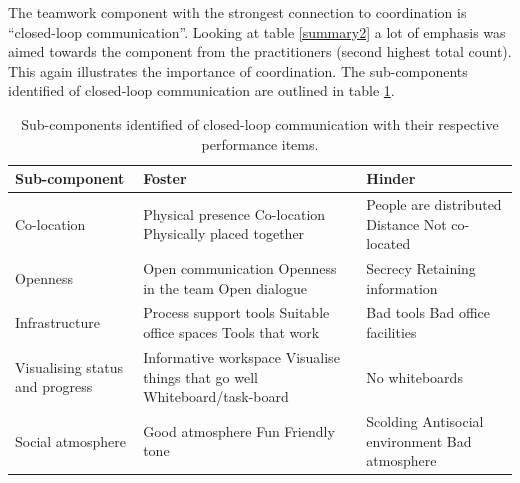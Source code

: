 The teamwork component with the strongest connection to coordination is ``closed-loop communication''. Looking at table \ref{summary2} a lot of emphasis was aimed towards the component from the practitioners (second highest total count). This again illustrates the importance of coordination. The sub-components identified of closed-loop communication are outlined in table \ref{closedloop}.

\begin{table}[H]
\begin{center}
    \begin{tabular}{ | p{4cm} | p{5.25cm} | p{5.25cm} |}
    \hline
    \textbf{Sub-component} & \textbf{Foster} & \textbf{Hinder} \\ \hline
    Co-location & Physical presence \newline Co-location \newline Physically placed together & People are distributed \newline Distance \newline Not co-located \\ \hline
    Openness & Open communication \newline Openness in the team \newline Open dialogue & Secrecy \newline Retaining information \\ \hline
    Infrastructure & Process support tools \newline Suitable office spaces \newline Tools that work & Bad tools \newline Bad office facilities \\ \hline
    Visualising status and progress & Informative workspace \newline Visualise things that go well \newline Whiteboard/task-board & No whiteboards \\ \hline
    Social atmosphere & Good atmosphere \newline Fun \newline Friendly tone & Scolding \newline Antisocial environment \newline Bad atmosphere \\ \hline
    \end{tabular}
    \caption{Sub-components identified of closed-loop communication with their respective performance items.}
    \label{closedloop}
\end{center}
\end{table}

